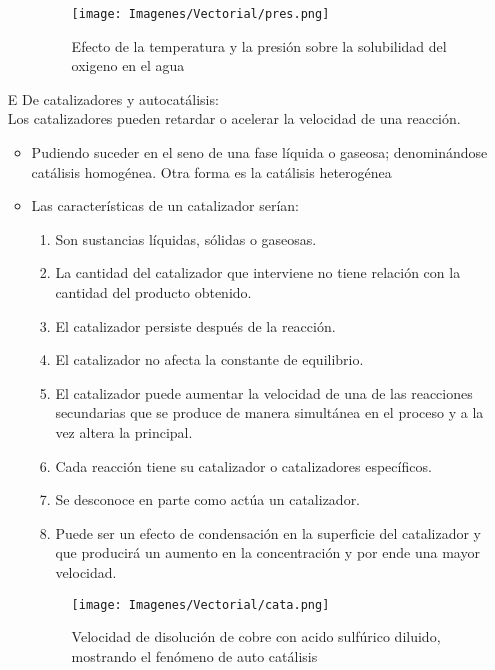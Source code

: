 \begin{itemize}
\begin{itemize}
\begin{figure}[H]
 \centering
 \texttt{[image: Imagenes/Vectorial/pres.png]}
 \caption{Efecto de la temperatura y la presi\'on sobre la solubilidad del oxigeno en el agua}
 \label{fig:pr}
\end{figure}
\end{itemize}
\item[E] De catalizadores y autocat\'alisis:\\
Los catalizadores pueden retardar o acelerar la velocidad de una reacci\'on.
\begin{itemize}
 \item	Pudiendo suceder en el seno de	una fase l\'iquida o gaseosa; denomin\'andose cat\'alisis homog\'enea. Otra forma es la cat\'alisis heterog\'enea
 \item Las caracter\'isticas de un catalizador ser\'ian:
 \begin{enumerate}
  \item  Son sustancias l\'iquidas, s\'olidas o gaseosas.
\item La cantidad del catalizador que interviene no tiene relaci\'on con la cantidad del producto obtenido.
\item El catalizador persiste despu\'es de la reacci\'on.
 \item El catalizador no afecta la constante de equilibrio.
\item  El catalizador puede aumentar la velocidad de una de las reacciones secundarias que se produce de manera simult\'anea en el proceso y a la vez altera la principal.
\item Cada reacci\'on tiene su catalizador o catalizadores espec\'ificos.
 \item Se desconoce en parte como act\'ua un catalizador.
\item Puede ser	un efecto de	condensaci\'on en la	superficie del catalizador y que producir\'a un aumento en la concentraci\'on y por ende una mayor velocidad.
 \end{enumerate}
\begin{figure}[H]
 \centering
 \texttt{[image: Imagenes/Vectorial/cata.png]}
 \caption{Velocidad de disoluci\'on de cobre con acido sulf\'urico diluido, mostrando el fen\'omeno de auto cat\'alisis}
 \label{fig:cay}
\end{figure}
\end{itemize}
\end{itemize}

